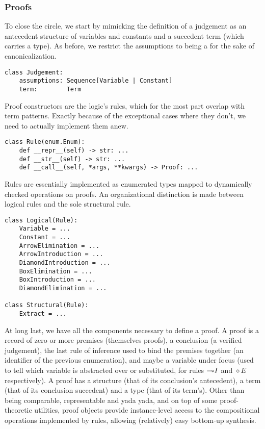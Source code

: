 \subsubsection{Proofs}
To close the circle, we start by mimicking the definition of a judgement as an antecedent structure of variables and constants and a succedent term (which carries a type).
As before, we restrict the assumptions to being a  for the sake of canonicalization.

\begin{verbatim}
class Judgement:
    assumptions: Sequence[Variable | Constant]
    term:        Term
\end{verbatim}

\noindent Proof constructors are the logic's rules, which for the most part overlap with term patterns.
Exactly because of the exceptional cases where they don't, we need to actually implement them anew.

\begin{verbatim}
class Rule(enum.Enum):
    def __repr__(self) -> str: ...
    def __str__(self) -> str: ...
    def __call__(self, *args, **kwargs) -> Proof: ...
\end{verbatim}

\noindent Rules are essentially implemented as enumerated types mapped to dynamically checked operations on proofs.
An organizational distinction is made between logical rules and the sole structural rule.

\begin{verbatim}
class Logical(Rule):
    Variable = ...
    Constant = ...
    ArrowElimination = ...
    ArrowIntroduction = ...
    DiamondIntroduction = ...
    BoxElimination = ...
    BoxIntroduction = ...
    DiamondElimination = ...

class Structural(Rule):
    Extract = ...
\end{verbatim}

\noindent At long last, we have all the components necessary to define a proof.
A proof is a record of zero or more premises (themselves proofs), a conclusion (a verified judgement), the last rule of inference used to bind the premises together (an identifier of the previous enumeration), and maybe a variable under focus (used to tell which variable is abstracted over or substituted, for rules $\li I$ and $\diamond E$ respectively).
A proof has a structure (that of its conclusion's antecedent), a term (that of its conclusion succedent) and a type (that of its term's).
Other than being comparable, representable and yada yada, and on top of some proof-theoretic utilities, proof objects provide instance-level access to the compositional operations implemented by rules, allowing (relatively) easy bottom-up synthesis.

